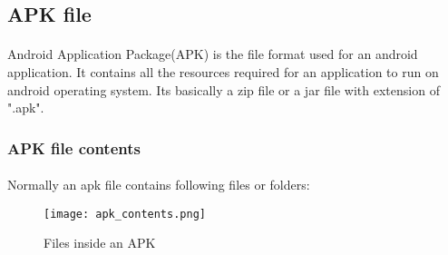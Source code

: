 \documentclass[../main.tex]{subfile}
\begin{document}
	\subsection{APK file}\label{sec:apk}	
		\paragraph{} Android Application Package(APK) is the file format used for an android application. It contains all the resources required for an application to run on android operating system. Its basically a zip file or a jar file with extension of ".apk"\cite{APK_structure}.
		\subsubsection{APK file contents}
		\paragraph{} Normally an apk file contains following files or folders:
		
		\begin{figure}[h]
			\centering
			\texttt{[image: apk\_contents.png]}
			\caption{Files inside an APK}
		\end{figure}
		
\end{document}
